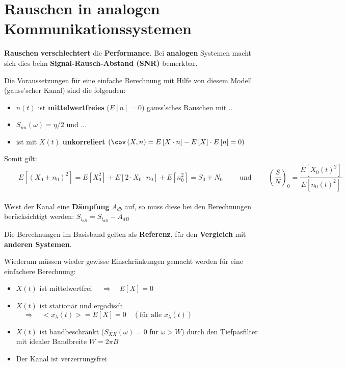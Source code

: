 \section{Rauschen in analogen Kommunikationssystemen }
\textbf{Rauschen} \textbf{verschlechtert} die \textbf{Performance}. Bei \textbf{analogen} Systemen
macht sich dies beim \textbf{Signal-Rausch-Abstand (SNR)} bemerkbar.
\begin{figure}[!ht]
\begin{center}
	
\end{center}
\end{figure}
Die Voraussetzungen für eine einfache Berechnung mit Hilfe von diesem Modell (gauss'scher Kanal)
sind die folgenden:
\begin{itemize}
  \item $n(t)$ ist \textbf{mittelwertfreies} ($E[n] = 0$) gauss'sches Rauschen mit ..
  \item $S_{nn}(\omega) = \eta/2$ und $\ldots$
  \item ist mit $X \left( t \right)$ \textbf{unkorreliert} $\left( \cov
  \left(X,n \right) = E \left[ X \cdot n \right] - E \left[ X \right] \cdot E
  \left[ n \right] = 0 \right)$
\end{itemize}
Somit gilt: $\qquad E[(X_0 + n_0)^2] = E[X_0^2] + E[2 \cdot X_0 \cdot n_0] + E[n_0^2] = S_0 + N_0
\qquad \text{ und } \qquad \left(\dfrac{S}{N}\right)_0 = \dfrac{E[X_0(t)^2]}{E[n_0(t)^2]}$ \\ \\
Weist der Kanal eine \textbf{Dämpfung} $A_{db}$ auf, so muss diese bei den Berechnungen berücksichtigt
werden: $S_{i_{dB}} = S_{t_{dB}} - A_{dB}$



Die Berechnungen im Basisband gelten als \textbf{Referenz}, für den \textbf{Vergleich} mit
\textbf{anderen Systemen}. \\
\begin{figure}[!ht]
\begin{center}
	
\end{center}
\end{figure}
Wiederum müssen wieder gewisse Einschränkungen gemacht werden für eine einfachere Berechnung:
\begin{itemize}
  \item $X(t)$ ist mittelwertfrei $\quad \Rightarrow \quad E[X]=0$
  \item $X(t)$ ist stationär und ergodisch $\quad \Rightarrow \quad <x_{\lambda}(t)> = E[X] = 0
  \quad (\text{für alle } x_{\lambda}(t))$
  \item $X(t)$ ist bandbeschränkt ($S_{XX}(\omega) = 0 $ für $\omega > W$) durch den Tiefpasfilter
  mit idealer Bandbreite $W = 2 \pi B$
  \item Der Kanal ist verzerrungsfrei
\end{itemize}

